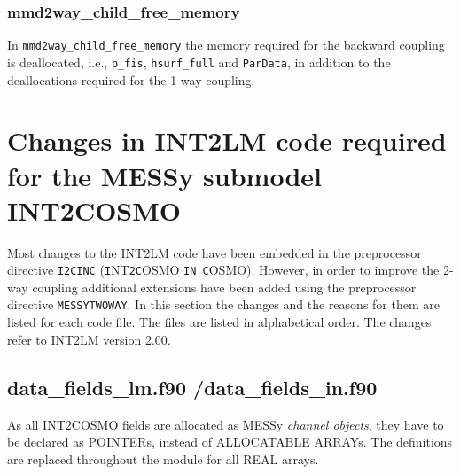 \documentclass[11pt,twoside]{article}
\begin{document}
\subsubsection{mmd2way\_child\_free\_memory}
In \verb|mmd2way_child_free_memory| the memory required for the backward
coupling is deallocated, i.e., \verb|p_fis|, \verb|hsurf_full|
and \verb|ParData|, in addition to the deallocations required for the
1-way coupling. 

\section{Changes in INT2LM code required for the MESSy submodel INT2COSMO}
\label{sec:INT2COSMOcode}

Most changes to the INT2LM code have been embedded in the preprocessor
directive {\tt \large I2CINC} 
({\tt \large I}{\footnotesize NT}{\tt \large 2C}{\footnotesize OSMO} 
{\tt \large IN C}{\footnotesize OSMO}).
However, in order to improve the 2-way coupling additional extensions
have been added using the preprocessor directive  {\tt \large MESSYTWOWAY}. 
In this section the changes and the reasons for them are listed for each code 
file. The files are listed in alphabetical order.
The changes refer to INT2LM version 2.00.
\subsection{data\_fields\_lm.f90 /data\_fields\_in.f90 }
As all INT2COSMO fields are allocated as MESSy {\it channel objects},
 they have to be declared as {\footnotesize POINTER}s, instead of 
{\footnotesize ALLOCATABLE ARRAYs}. 
The definitions are replaced throughout the module for all {\footnotesize REAL} 
arrays.
\end{document}
